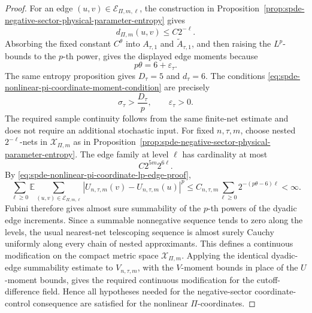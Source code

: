 \begin{proof}
For an edge \((u,v)\in\mathcal E_{\Pi,m,\ell}\), the construction in
Proposition~\ref{prop:spde-negative-sector-physical-parameter-entropy} gives
\[
  d_{\Pi,m}(u,v)\leq C2^{-\ell}.
\]
Absorbing the fixed constant \(C^\theta\) into \(A_{\tau,1}\) and
\(\widetilde A_{\tau,1}\), and then raising the \(L^p\)-bounds to the
\(p\)-th power, gives the displayed edge moments because
\[
  p\theta=6+\varepsilon_\tau .
\]
The same entropy proposition gives \(D_\tau=5\) and \(d_\tau=6\).  The
conditions
\eqref{eq:spde-nonlinear-pi-coordinate-moment-condition} are precisely
\[
  \sigma_\tau>\frac{D_\tau}{p},
  \qquad
  \varepsilon_\tau>0 .
\]
The required sample continuity follows from the same finite-net estimate and
does not require an additional stochastic input.  For fixed \(n,\tau,m\),
choose nested \(2^{-\ell}\)-nets in \(\mathcal X_{\Pi,m}\) as in
Proposition~\ref{prop:spde-negative-sector-physical-parameter-entropy}.  The
edge family at level \(\ell\) has cardinality at most
\[
  C2^{5m}2^{6\ell}.
\]
By \eqref{eq:spde-nonlinear-pi-coordinate-lp-edge-proof},
\[
  \sum_{\ell\geq0}
  \mathbb E
  \sum_{(u,v)\in\mathcal E_{\Pi,m,\ell}}
  |U_{n,\tau,m}(v)-U_{n,\tau,m}(u)|^p
  \leq
  C_{n,\tau,m}
  \sum_{\ell\geq0}2^{-(p\theta-6)\ell}<\infty .
\]
Fubini therefore gives almost sure summability of the \(p\)-th powers of the
dyadic edge increments.  Since a summable nonnegative sequence tends to zero
along the levels, the usual nearest-net telescoping sequence is almost surely
Cauchy uniformly along every chain of nested approximants.  This defines a
continuous modification on the compact metric space
\(\mathcal X_{\Pi,m}\).  Applying the identical dyadic-edge summability
estimate to \(V_{n,\tau,m}\), with the \(V\)-moment bounds in place of the
\(U\)-moment bounds, gives the required continuous modification for the
cutoff-difference field.  Hence all hypotheses needed for
the negative-sector coordinate-control consequence are
satisfied for the nonlinear \(\Pi\)-coordinates.
\end{proof}

